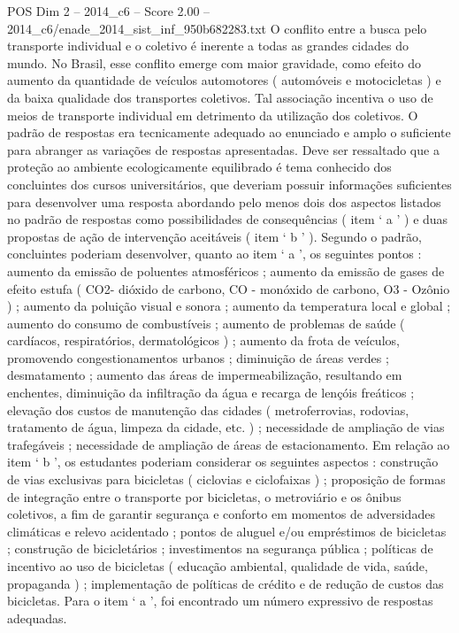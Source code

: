 \begin{textsample}{POS Dim 2 – 2014\_c6 – Score 2.00 – 2014\_c6/enade\_2014\_sist\_inf\_950b682283.txt}
O conflito entre a busca pelo transporte individual e o coletivo é inerente a todas as grandes cidades do mundo.
No Brasil, esse conflito emerge com maior gravidade, como efeito do aumento da quantidade de veículos automotores ( automóveis e motocicletas ) e da baixa qualidade dos transportes coletivos.
Tal associação incentiva o uso de meios de transporte individual em detrimento da utilização dos coletivos.
O padrão de respostas era tecnicamente adequado ao enunciado e amplo o suficiente para abranger as variações de respostas apresentadas.
Deve ser ressaltado que a proteção ao ambiente ecologicamente equilibrado é tema conhecido dos concluintes dos cursos universitários, que deveriam possuir informações suficientes para desenvolver uma resposta abordando pelo menos dois dos aspectos listados no padrão de respostas como possibilidades de consequências ( item ‘ a ’ ) e duas propostas de ação de intervenção aceitáveis ( item ‘ b ’ ).
Segundo o padrão, concluintes poderiam desenvolver, quanto ao item ‘ a ’, os seguintes pontos : aumento da emissão de poluentes atmosféricos ; aumento da emissão de gases de efeito estufa ( CO2- dióxido de carbono, CO - monóxido de carbono, O3 - Ozônio ) ; aumento da poluição visual e sonora ; aumento da temperatura local e global ; aumento do consumo de combustíveis ; aumento de problemas de saúde ( cardíacos, respiratórios, dermatológicos ) ; aumento da frota de veículos, promovendo congestionamentos urbanos ; diminuição de áreas verdes ; desmatamento ; aumento das áreas de impermeabilização, resultando em enchentes, diminuição da infiltração da água e recarga de lençóis freáticos ; elevação dos custos de manutenção das cidades ( metroferrovias, rodovias, tratamento de água, limpeza da cidade, etc. ) ; necessidade de ampliação de vias trafegáveis ; necessidade de ampliação de áreas de estacionamento.
Em relação ao item ‘ b ’, os estudantes poderiam considerar os seguintes aspectos : construção de vias exclusivas para bicicletas ( ciclovias e ciclofaixas ) ; proposição de formas de integração entre o transporte por bicicletas, o metroviário e os ônibus coletivos, a fim de garantir segurança e conforto em momentos de adversidades climáticas e relevo acidentado ; pontos de aluguel e/ou empréstimos de bicicletas ; construção de bicicletários ; investimentos na segurança pública ; políticas de incentivo ao uso de bicicletas ( educação ambiental, qualidade de vida, saúde, propaganda ) ; implementação de políticas de crédito e de redução de custos das bicicletas.
Para o item ‘ a ’, foi encontrado um número expressivo de respostas adequadas.

\end{textsample}
